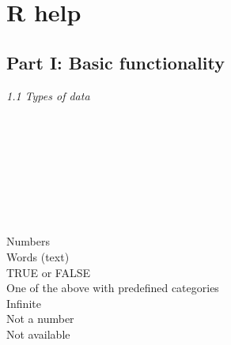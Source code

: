 \section{R help}
\label{rhelp}

\subsection{Part I: Basic functionality}

\textit{1.1 Types of data} \\
\\
\begin{minipage}[t]{.4\textwidth}
\vspace*{-8pt}
 \\
 \\
 \\
 \\ 			
 \\					
 \\ 					 
\end{minipage}
\begin{minipage}[t]{.6\textwidth}
Numbers \\
Words (text) \\
TRUE or FALSE \\
One of the above with predefined categories \\
Infinite \\
Not a number \\
Not available
\end{minipage}
\vspace*{.5cm}

